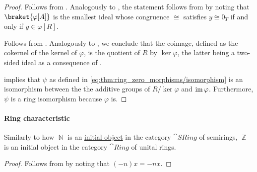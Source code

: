 \begin{proof}
   Follows from .
   Analogously to , the statement follows from  by noting that \( \braket{ \varphi[A] } \) is the smallest ideal whose congruence \( \cong \) satisfies \( y \cong 0_T \) if and only if \( y \in \varphi[R] \).

   Follows from .
   Analogously to , we conclude that the coimage, defined as the cokernel of the kernel of \( \varphi \), is the quotient of \( R \) by \( \ker \varphi \), the latter being a two-sided ideal as a consequence of .

    implies that \( \psi \) as defined in \eqref{eq:thm:ring_zero_morphisms/isomorphism} is an isomorphism between the the additive groups of \( R / \ker \varphi \) and \( \operatorname{im} \varphi \). Furthermore, \( \psi \) is a ring isomorphism because \( \varphi \) is.
\end{proof}

\paragraph{Ring characteristic}

\begin{proposition}\label{thm:ring_characteristic_homomorphism}
  Similarly to how \( \BbbN \) is an \hyperref[def:universal_objects/initial]{initial object} in the category \hyperref[def:semiring/category]{\( \cat{SRing} \)} of semirings, \( \BbbZ \) is an initial object in the category \hyperref[def:ring/category]{\( \cat{Ring} \)} of unital rings.
\end{proposition}
\begin{proof}
  Follows from  by noting that \( (-n)x = -nx \).
\end{proof}

